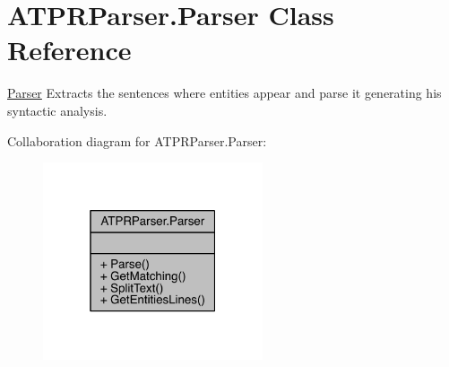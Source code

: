 \hypertarget{class_a_t_p_r_parser_1_1_parser}{}\section{A\+T\+P\+R\+Parser.\+Parser Class Reference}
\label{class_a_t_p_r_parser_1_1_parser}


\hyperlink{class_a_t_p_r_parser_1_1_parser}{Parser} Extracts the sentences where entities appear and parse it generating his syntactic analysis.  




Collaboration diagram for A\+T\+P\+R\+Parser.\+Parser\+:
\nopagebreak
\begin{figure}[H]
\begin{center}
\leavevmode
\includegraphics[width=184pt]{de/d41/class_a_t_p_r_parser_1_1_parser__coll__graph}
\end{center}
\end{figure}

